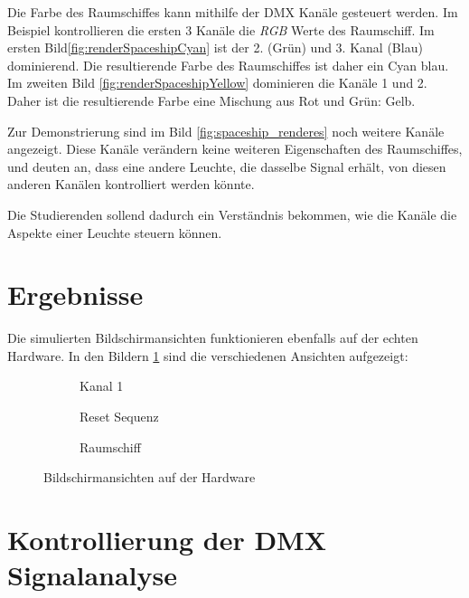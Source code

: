 Die Farbe des Raumschiffes kann mithilfe der DMX Kanäle gesteuert werden. Im Beispiel kontrollieren die ersten 3 Kanäle die \emph{RGB} Werte des Raumschiff. Im ersten Bild\ref{fig:renderSpaceshipCyan} ist der 2. (Grün) und 3. Kanal (Blau) dominierend. Die resultierende Farbe des Raumschiffes ist daher ein Cyan blau. Im zweiten Bild \ref{fig:renderSpaceshipYellow} dominieren die Kanäle 1 und 2. Daher ist die resultierende Farbe eine Mischung aus Rot und Grün: Gelb.

Zur Demonstrierung sind im Bild \ref{fig:spaceship_renderes} noch weitere Kanäle angezeigt. Diese Kanäle verändern keine weiteren Eigenschaften des Raumschiffes, und deuten an, dass eine andere Leuchte, die dasselbe Signal erhält, von diesen anderen Kanälen kontrolliert werden könnte.

Die Studierenden sollend dadurch ein Verständnis bekommen, wie die Kanäle die Aspekte einer Leuchte steuern können.

\section{Ergebnisse}

Die simulierten Bildschirmansichten funktionieren ebenfalls auf der echten Hardware. In den Bildern \ref{fig:dmxScreensOnHardware} sind die verschiedenen Ansichten aufgezeigt:

\begin{figure}[H]
	\centering
	\begin{subfigure}{.32\textwidth}
		\centering
		\caption{Kanal 1}
	\end{subfigure}
	\hfill
	\begin{subfigure}{.32\textwidth}
		\centering
		\caption{Reset Sequenz}
	\end{subfigure}
	\hfill
	\begin{subfigure}{.32\textwidth}
		\centering
		\caption{Raumschiff}
	\end{subfigure}
	\caption{Bildschirmansichten auf der Hardware}
	\label{fig:dmxScreensOnHardware}
\end{figure}


\section{Kontrollierung der DMX Signalanalyse}

